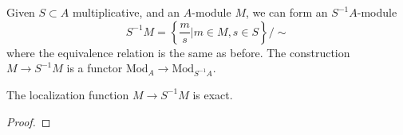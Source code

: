 \documentclass{../mathnotes}
\begin{document}
Given $S\subset A$ multiplicative, and an $A$-module $M$, we can form an $S^{-1}A$-module
\[S^{-1}M=\left\{ \frac{m}{s}|m\in M,s\in S \right\}/\sim\]
where the equivalence relation is the same as before. The construction $M\to S^{-1}M$ is a functor $\text{Mod}_A\to\text{Mod}_{S^{-1}A}$.

\begin{lem}
    The localization function $M\to S^{-1}M$ is exact.
\end{lem}
\begin{proof}
\end{proof}
\end{document}

